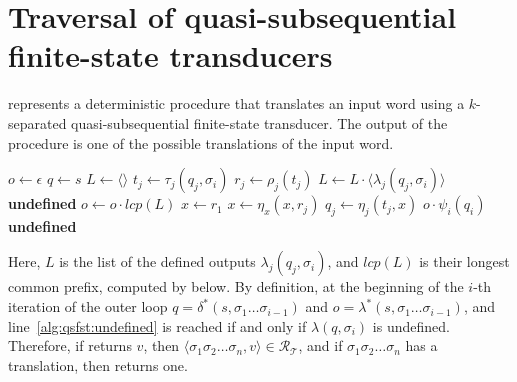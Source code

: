 \section{Traversal of quasi-subsequential finite-state transducers}

 represents a deterministic procedure that translates an
input word using a $k$-separated quasi-subsequential finite-state transducer. The
output of the procedure is one of the possible translations of the input word.

\begin{algorithm}[h]
  \DontPrintSemicolon

  $o \gets \epsilon$\;
  $q \gets s$\;
   {
    $L \gets \langle \rangle$\;
     {
      $t_j \gets \tau_j(q_j, \sigma_i)$\;
      $r_j \gets \rho_j(t_j)$\;
       {
        $L \gets L \cdot \langle \lambda_j(q_j, \sigma_i) \rangle$\;
      }
    }
     {
      \Return \textbf{undefined}\;
    }
    $o \gets o \cdot lcp(L)$\;
    $x \gets r_1$\;
     {
      $x \gets \eta_x(x, r_j)$\;
    }
     {
      $q_j \gets \eta_j(t_j, x)$\;
    }
  }
   {
     {
      \Return $o \cdot \psi_i(q_i)$\;
    }
  }
  \Return \textbf{undefined}\;

  \caption{Traversal of a $k$-separated quasi-subsequential finite-state transducer.}
  \label{alg:qsfst_traversal}
\end{algorithm}

Here, $L$ is the list of the defined outputs $\lambda_j(q_j, \sigma_i)$, and
$lcp(L)$ is their longest common prefix, computed by  below. By
definition, at the beginning of the $i$-th iteration of the outer loop $q =
\delta^*(s, \sigma_1 \ldots \sigma_{i-1})$ and $o = \lambda^*(s, \sigma_1 \ldots
\sigma_{i-1})$, and line~\ref{alg:qsfst:undefined} is reached if and only if
$\lambda(q, \sigma_i)$ is undefined. Therefore, if  returns
$v$, then $\langle \sigma_1 \sigma_2 \ldots \sigma_n, v \rangle \in
\mathcal{R}_\mathcal{T}$, and if $\sigma_1 \sigma_2 \ldots \sigma_n$ has a translation,
then  returns one.


